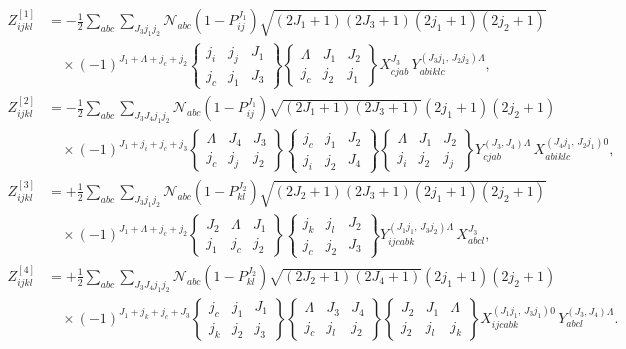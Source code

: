 \documentclass{scrartcl}
\begin{document}
\begin{align}
Z_{ijkl}^{[1]}
&= -\frac12\sum_{abc}\sum_{J_3 j_1 j_2}
\mathcal{N}_{abc}(1-P_{ij}^{J_1})
\sqrt{(2J_1+1)(2J_3+1)(2j_1+1)(2j_2+1)}
\nonumber\\
&\quad\times (-1)^{J_1+\Lambda+j_c+j_2}
\begin{Bmatrix} j_i&j_j&J_1\\ j_c&j_1&J_3\end{Bmatrix}
\begin{Bmatrix} \Lambda&J_1&J_2\\ j_c&j_2&j_1\end{Bmatrix}
X^{J_3}_{cjab}\,Y^{(J_3 j_1,\,J_2 j_2)\Lambda}_{abiklc},
\\[0.8em]
Z_{ijkl}^{[2]}
&= -\frac12\sum_{abc}\sum_{J_3 J_4 j_1 j_2}
\mathcal{N}_{abc}(1-P_{ij}^{J_1})
\sqrt{(2J_1+1)(2J_3+1)}(2j_1+1)(2j_2+1)
\nonumber\\
&\quad\times (-1)^{J_1+j_i+j_c+j_3}
\begin{Bmatrix}\Lambda&J_4&J_3\\ j_c&j_j&j_2\end{Bmatrix}
\begin{Bmatrix}j_c&j_1&J_2\\ j_i&j_2&J_4\end{Bmatrix}
\begin{Bmatrix}\Lambda&J_1&J_2\\ j_i&j_2&j_j\end{Bmatrix}
Y^{(J_3,J_4)\Lambda}_{cjab}\,X^{(J_4 j_1,\,J_2 j_1)0}_{abiklc},
\\[0.8em]
Z_{ijkl}^{[3]}
&= +\frac12\sum_{abc}\sum_{J_3 j_1 j_2}
\mathcal{N}_{abc}(1-P_{kl}^{J_2})
\sqrt{(2J_2+1)(2J_3+1)(2j_1+1)(2j_2+1)}
\nonumber\\
&\quad\times (-1)^{J_1+\Lambda+j_c+j_2}
\begin{Bmatrix}J_2&\Lambda&J_1\\ j_1&j_c&j_2\end{Bmatrix}
\begin{Bmatrix}j_k&j_l&J_2\\ j_c&j_2&J_3\end{Bmatrix}
Y^{(J_1 j_1,\,J_3 j_2)\Lambda}_{ijcabk}\,X^{J_3}_{abcl},
\\[0.8em]
Z_{ijkl}^{[4]}
&= +\frac12\sum_{abc}\sum_{J_3 J_4 j_1 j_2}
\mathcal{N}_{abc}(1-P_{kl}^{J_2})
\sqrt{(2J_2+1)(2J_4+1)}(2j_1+1)(2j_2+1)
\nonumber\\
&\quad\times (-1)^{J_1+j_k+j_c+J_3}
\begin{Bmatrix}j_c&j_1&J_1\\ j_k&j_2&j_3\end{Bmatrix}
\begin{Bmatrix}\Lambda&J_3&J_4\\ j_c&j_l&j_2\end{Bmatrix}
\begin{Bmatrix}J_2&J_1&\Lambda\\ j_2&j_l&j_k\end{Bmatrix}
X^{(J_1 j_1,\,J_3 j_1)0}_{ijcabk}\,Y^{(J_3,J_4)\Lambda}_{abcl}.
\end{align}
\end{document}
